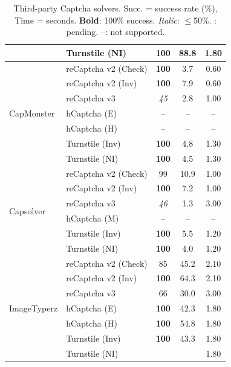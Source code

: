 \begin{table}[t!]
\begin{tabular}{l l c c c}
 & Turnstile (NI) & \textbf{100} & 88.8 & 1.80 \\
\midrule
\multirow{7}{*}{CapMonster} & reCaptcha v2 (Check) & \textbf{100} & 3.7 & 0.60 \\
 & reCaptcha v2 (Inv) & \textbf{100} & 7.9 & 0.60 \\
 & reCaptcha v3 & \textit{45} & 2.8 & 1.00 \\
 & hCaptcha (E) & -- & -- & -- \\
 & hCaptcha (H) & -- & -- & -- \\
 & Turnstile (Inv) & \textbf{100} & 4.8 & 1.30 \\
 & Turnstile (NI) & \textbf{100} & 4.5 & 1.30 \\
\midrule
\multirow{6}{*}{Capsolver} & reCaptcha v2 (Check) & 99 & 10.9 & 1.00 \\
 & reCaptcha v2 (Inv) & \textbf{100} & 7.2 & 1.00 \\
 & reCaptcha v3 & \textit{46} & 1.3 & 3.00 \\
 & hCaptcha (M) & -- & -- & -- \\
 & Turnstile (Inv) & \textbf{100} & 5.5 & 1.20 \\
 & Turnstile (NI) & \textbf{100} & 4.0 & 1.20 \\
\midrule
\multirow{7}{*}{ImageTyperz} & reCaptcha v2 (Check) & 85 & 45.2 & 2.10 \\
 & reCaptcha v2 (Inv) & \textbf{100} & 64.3 & 2.10 \\
 & reCaptcha v3 & 66 & 30.0 & 3.00 \\
 & hCaptcha (E) & \textbf{100} & 42.3 & 1.80 \\
 & hCaptcha (H) & \textbf{100} & 54.8 & 1.80 \\
 & Turnstile (Inv) & \textbf{100} & 43.3 & 1.80 \\
 & Turnstile (NI) & \ph{} & \ph{} & 1.80 \\
\bottomrule
\end{tabular}
\caption{Third-party Captcha solvers. Succ. = success rate (\%), Time = seconds. \textbf{Bold}: 100\% success. \textit{Italic}: $\leq$50\%. \ph{}: pending. --: not supported.}
\label{tab:third_party_services_results}
\end{table}